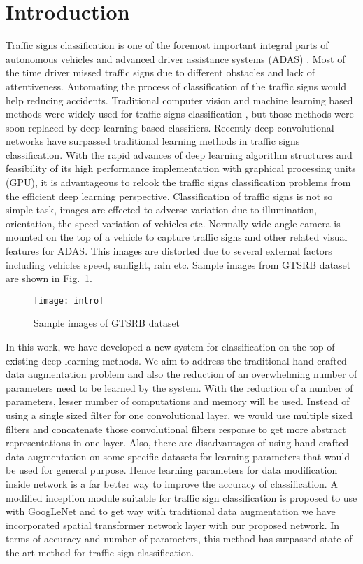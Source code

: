 \documentclass[conference]{IEEEtran}
\begin{document}
\section{Introduction}
Traffic signs classification is one of the foremost important integral parts of autonomous vehicles and advanced driver assistance systems (ADAS) \cite{haloi1, trivedisurvey, haloi2, haloi3, activity}. Most of the time driver missed traffic 
signs due to different obstacles and lack of attentiveness. Automating the process of classification of the traffic signs would help reducing accidents.
Traditional computer vision and machine learning based methods were widely used for traffic signs 
classification \cite{le,plsa}, but those methods were soon replaced by deep learning based classifiers. Recently deep convolutional networks have surpassed traditional learning methods in traffic signs classification. With the rapid advances of deep learning algorithm structures and feasibility of its high performance implementation with graphical processing units (GPU), it is advantageous to relook the traffic signs classification problems from the efficient deep learning perspective.       
 Classification of traffic signs is not so simple task, images are effected to adverse variation due to illumination, orientation, the speed variation of vehicles etc. Normally wide angle camera is mounted on the top of a vehicle to capture traffic signs and other related visual features for ADAS. This images are distorted due to several external factors including vehicles speed, sunlight, rain etc. Sample images from GTSRB dataset are shown in Fig.~\ref{fig:intro}.
 \begin{figure}
  \centering
      \texttt{[image: intro]}
\caption{Sample images of GTSRB dataset}
\label{fig:intro}
\end{figure}

 In this work, we have developed a new system for classification on the top of existing deep learning methods. We aim to address the traditional hand crafted data augmentation problem and also the reduction of an overwhelming number of parameters need to be learned by the system. With the reduction of a number of parameters, lesser number of computations and memory will be used. Instead of using a single sized filter for one convolutional layer, we would use multiple sized filters and concatenate those convolutional filters response to get more abstract representations in one layer. Also, there are disadvantages of using hand crafted data augmentation on some specific datasets for learning parameters that would be used for general purpose. Hence learning parameters for data modification inside network is a far better way to improve the accuracy of classification.   
 A modified inception module suitable for traffic sign classification is proposed to use with GoogLeNet \cite{googlenet} and to get way with traditional data augmentation we have incorporated spatial transformer network \cite{stn} layer with our proposed network. In terms of accuracy and number of parameters, this method has surpassed state of the art method for traffic sign classification.
\end{document}

